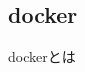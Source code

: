 \documentclass[../../../main]{subfiles}
\begin{document}
    \subsection{docker}\label{subsec:phraseology-docker}

    dockerとは
\end{document}
